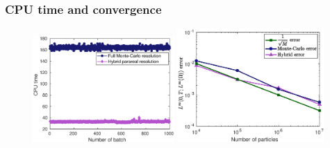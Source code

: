 \documentclass[10 pt]{beamer}
\begin{document}
\begin{frame}
 \frametitle{CPU time and convergence}
\vspace*{-0.3 cm}
 \begin{figure}
\centering
\includegraphics[width=0.48\textwidth]{image/CPU_time_hybrid_vs_MC}
\includegraphics[width=0.5\textwidth]{image/Linf_error}
\end{figure}


\end{frame}
\end{document}

